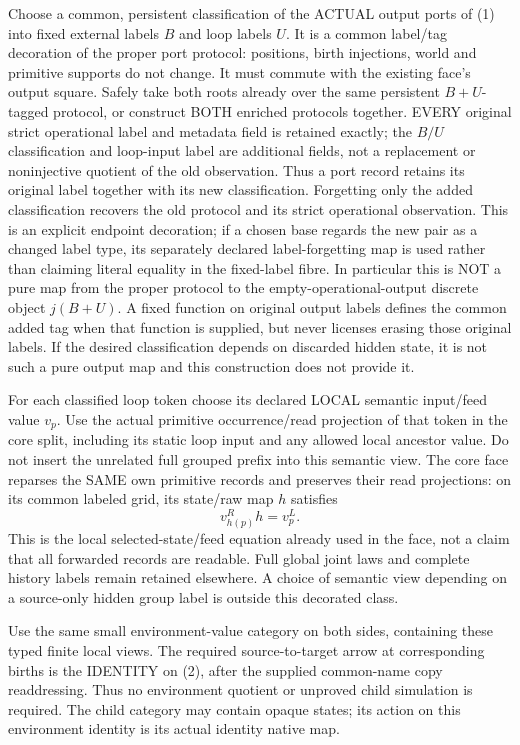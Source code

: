 \documentclass[11pt]{article}
\begin{document}
Choose a common, persistent classification of the ACTUAL output ports of (1) into fixed external labels $B$ and loop labels $U$. It is a common label/tag decoration of the proper port protocol: positions, birth injections, world and primitive supports do not change. It must commute with the existing face's output square. Safely take both roots already over the same persistent $B+U$-tagged protocol, or construct BOTH enriched protocols together. EVERY original strict operational label and metadata field is retained exactly; the $B/U$ classification and loop-input label are additional fields, not a replacement or noninjective quotient of the old observation. Thus a port record retains its original label together with its new classification. Forgetting only the added classification recovers the old protocol and its strict operational observation. This is an explicit endpoint decoration; if a chosen base regards the new pair as a changed label type, its separately declared label-forgetting map is used rather than claiming literal equality in the fixed-label fibre. In particular this is NOT a pure map from the proper protocol to the empty-operational-output discrete object $j(B+U)$. A fixed function on original output labels defines the common added tag when that function is supplied, but never licenses erasing those original labels. If the desired classification depends on discarded hidden state, it is not such a pure output map and this construction does not provide it.

For each classified loop token choose its declared LOCAL semantic input/feed value $v_p$. Use the actual primitive occurrence/read projection of that token in the core split, including its static loop input and any allowed local ancestor value. Do not insert the unrelated full grouped prefix into this semantic view. The core face reparses the SAME own primitive records and preserves their read projections: on its common labeled grid, its state/raw map $h$ satisfies
\[
                          v^R_{h(p)}h=v^L_p.             \tag{2}
\]
This is the local selected-state/feed equation already used in the face, not a claim that all forwarded records are readable. Full global joint laws and complete history labels remain retained elsewhere. A choice of semantic view depending on a source-only hidden group label is outside this decorated class.

Use the same small environment-value category on both sides, containing these typed finite local views. The required source-to-target arrow at corresponding births is the IDENTITY on (2), after the supplied common-name copy readdressing. Thus no environment quotient or unproved child simulation is required. The child category may contain opaque states; its action on this environment identity is its actual identity native map.
\end{document}
